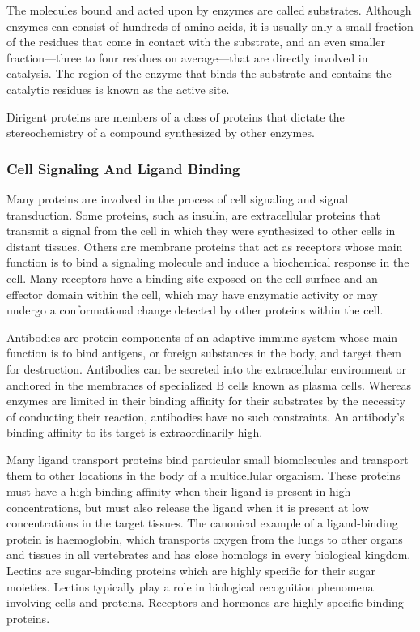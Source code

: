 The molecules bound and acted upon by enzymes are called substrates.
Although enzymes can consist of hundreds of amino acids, it is usually
only a small fraction of the residues that come in contact with the
substrate, and an even smaller fraction---three to four residues on
average---that are directly involved in catalysis. The region of the
enzyme that binds the substrate and contains the catalytic residues is
known as the active site.

Dirigent proteins are members of a class of proteins that dictate the
stereochemistry of a compound synthesized by other enzymes.

\hypertarget{cell-signaling-and-ligand-binding}{%
\subsubsection{Cell Signaling And Ligand
Binding}\label{cell-signaling-and-ligand-binding}}

Many proteins are involved in the process of cell signaling and signal
transduction. Some proteins, such as insulin, are extracellular proteins
that transmit a signal from the cell in which they were synthesized to
other cells in distant tissues. Others are membrane proteins that act as
receptors whose main function is to bind a signaling molecule and induce
a biochemical response in the cell. Many receptors have a binding site
exposed on the cell surface and an effector domain within the cell,
which may have enzymatic activity or may undergo a conformational change
detected by other proteins within the cell.

Antibodies are protein components of an adaptive immune system whose
main function is to bind antigens, or foreign substances in the body,
and target them for destruction. Antibodies can be secreted into the
extracellular environment or anchored in the membranes of specialized B
cells known as plasma cells. Whereas enzymes are limited in their
binding affinity for their substrates by the necessity of conducting
their reaction, antibodies have no such constraints. An antibody's
binding affinity to its target is extraordinarily high.

Many ligand transport proteins bind particular small biomolecules and
transport them to other locations in the body of a multicellular
organism. These proteins must have a high binding affinity when their
ligand is present in high concentrations, but must also release the
ligand when it is present at low concentrations in the target tissues.
The canonical example of a ligand-binding protein is haemoglobin, which
transports oxygen from the lungs to other organs and tissues in all
vertebrates and has close homologs in every biological kingdom. Lectins
are sugar-binding proteins which are highly specific for their sugar
moieties. Lectins typically play a role in biological recognition
phenomena involving cells and proteins. Receptors and hormones are
highly specific binding proteins.

